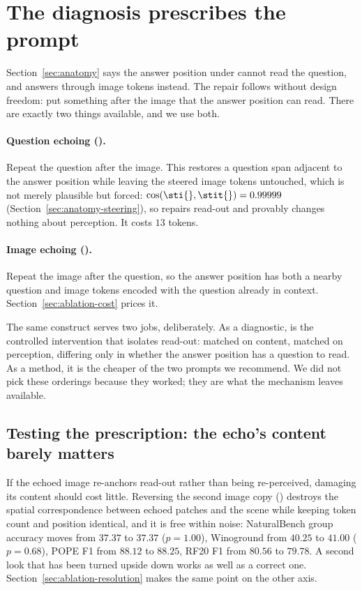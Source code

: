 \section{The diagnosis prescribes the prompt}
\label{sec:method}

Section~\ref{sec:anatomy} says the answer position under \sti{} cannot read the
question, and answers through image tokens instead. The repair follows without
design freedom: put something after the image that the answer position can read.
There are exactly two things available, and we use both.

\paragraph{Question echoing (\stit{}).} Repeat the question after the image. This
restores a question span adjacent to the answer position while leaving the
steered image tokens untouched, which is not merely plausible but forced:
$\cos(\sti{}, \stit{}) = 0.99999$ (Section~\ref{sec:anatomy-steering}), so
\stit{} repairs read-out and provably changes nothing about perception. It costs
$13$ tokens.

\paragraph{Image echoing (\sitit{}).} Repeat the image after the question, so the
answer position has both a nearby question and image tokens encoded with the
question already in context. Section~\ref{sec:ablation-cost} prices it.

The same construct serves two jobs, deliberately. As a diagnostic, \stit{} is the
controlled intervention that isolates read-out: matched on content, matched on
perception, differing only in whether the answer position has a question to read.
As a method, it is the cheaper of the two prompts we recommend. We did not pick
these orderings because they worked; they are what the mechanism leaves
available.

\subsection{Testing the prescription: the echo's content barely matters}
\label{sec:method-reversal}

If the echoed image re-anchors read-out rather than being re-perceived, damaging
its content should cost little. Reversing the second image copy (\sititrev{})
destroys the spatial correspondence between echoed patches and the scene while
keeping token count and position identical, and it is free within noise:
NaturalBench group accuracy moves from $37.37$ to $37.37$ ($p = 1.00$),
Winoground from $40.25$ to $41.00$ ($p = 0.68$), POPE F1 from $88.12$ to $88.25$,
RF20 F1 from $80.56$ to $79.78$. A second look that has been turned upside down
works as well as a correct one. Section~\ref{sec:ablation-resolution} makes the
same point on the other axis.

